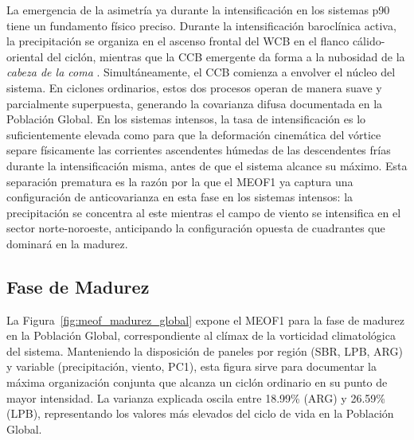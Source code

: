 La emergencia de la asimetría ya durante la intensificación en los sistemas p90 tiene un fundamento físico preciso. 
Durante la intensificación baroclínica activa, la precipitación se organiza en el ascenso frontal del WCB en el flanco cálido-oriental del ciclón, mientras que la CCB emergente da forma a la nubosidad de la \textit{cabeza de la coma} \citep{browning1986conceptual}.
Simultáneamente, el CCB comienza a envolver el núcleo del sistema.
En ciclones ordinarios, estos dos procesos operan de manera suave y parcialmente superpuesta, generando la covarianza difusa documentada en la Población Global. 
En los sistemas intensos, la tasa de intensificación es lo suficientemente elevada como para que la deformación cinemática del vórtice separe físicamente las corrientes ascendentes húmedas de las descendentes frías durante la intensificación misma, antes de que el sistema alcance su máximo. 
Esta separación prematura es la razón por la que el MEOF1 ya captura una configuración de anticovarianza en esta fase en los sistemas intensos: la precipitación se concentra al este mientras el campo de viento se intensifica en el sector norte-noroeste, anticipando la configuración opuesta de cuadrantes que dominará en la madurez.

\subsection{Fase de Madurez}
\label{subsec:meof_madurez}

La Figura~\ref{fig:meof_madurez_global} expone el MEOF1 para la fase de madurez en la Población Global, correspondiente al clímax de la vorticidad climatológica del sistema. 
Manteniendo la disposición de paneles por región (SBR, LPB, ARG) y variable (precipitación, viento, PC1), esta figura sirve para documentar la máxima organización conjunta que alcanza un ciclón ordinario en su punto de mayor intensidad. 
La varianza explicada oscila entre 18.99\% (ARG) y 26.59\% (LPB), representando los valores más elevados del ciclo de vida en la Población Global.

